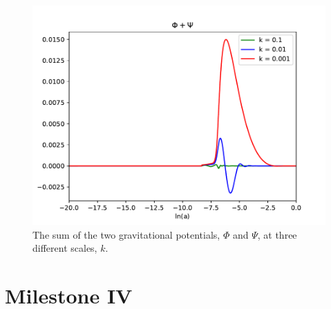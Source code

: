 \documentclass{aa}
\begin{document}
\begin{figure}[h!]
   \includegraphics[scale=0.5]{Figures/milestone_3/phipsi.pdf}
   \caption{The sum of the two gravitational potentials, $\Phi$ and $\Psi$, at three different scales, $k$.}\label{fig:M3_phipsi}
\end{figure}
















































\section{Milestone IV}\label{section:M4}
\end{document}
